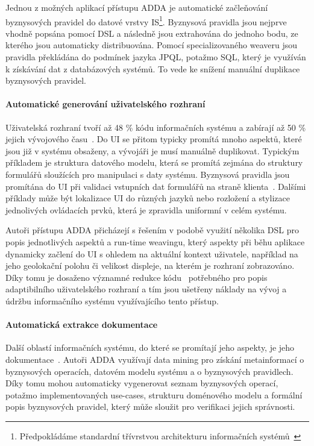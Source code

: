 Jednou z možných aplikací přístupu \gls{ADDA} je automatické začleňování
byznysových pravidel do datové vrstvy \gls{IS}\footnote{Předpokládáme standardní
třívrstvou architekturu informačních systémů~\cite{fowler2002patterns}}.
Byznysová pravidla jsou nejprve vhodně popsána pomocí \gls{DSL} a následně jsou
extrahována do jednoho bodu, ze kterého jsou automaticky distribuována.
Pomocí specializovaného weaveru jsou pravidla překládána do podmínek
jazyka \gls{JPQL}, potažmo \gls{SQL}, který je využíván k získávání dat
z databázových systémů. To vede ke snížení manuální duplikace byznysových
pravidel.

\paragraph{Automatické generování uživatelského rozhraní}

Uživatelská rozhraní tvoří až 48 \% kódu informačních systému
a zabírají až 50 \% jejich vývojového času~\cite{kennard2009separation}.
Do \gls{UI} se přitom typicky promítá mnoho aspektů, které jsou
již v systému obsaženy, a vývojáři je musí manuálně duplikovat.
Typickým příkladem je struktura datového modelu, která se promítá
zejmána do struktury formulářů sloužících pro manipulaci s daty systému.
Byznysová pravidla jsou promítána do \gls{UI} při validaci vstupních
dat formulářů na straně klienta~\cite{cemus2017separation}.
Dalšími příklady může být lokalizace \gls{UI} do různých jazyků
nebo rozložení a stylizace jednolivých ovládacích prvků, která
je zpravidla uniformní v celém systému.

Autoři přístupu \gls{ADDA} přicházejí s řešením v podobě
využití několika \gls{DSL} pro popis jednotlivých aspektů
a run-time weavingu, který aspekty při běhu aplikace
dynamicky začlení do \gls{UI} s ohledem na aktuální kontext
uživatele, například na jeho geolokační polohu či velikost
displeje, na kterém je rozhraní zobrazováno.
Díky tomu je dosaženo významné redukce kódu~\cite{cemus2016context}
potřebného pro popis adaptibilního uživatelského rozhraní
a tím jsou ušetřeny náklady na vývoj a údržbu informačního
systému využívajícího tento přístup.

\paragraph{Automatická extrakce dokumentace}

Další oblastí informačních systému, do které se promítají jeho aspekty,
je jeho dokumentace~\cite{cemus2017automated}. Autoři \gls{ADDA}
využívají data mining pro získání metainformací o byznysových operacích,
datovém modelu systému a o byznysových pravidlech. Díky tomu mohou
automaticky vygenerovat seznam byznysových operací, potažmo implementovaných
use-cases, strukturu doménového modelu a formální popis byznysových pravidel,
který může sloužit pro verifikaci jejich správnosti.


